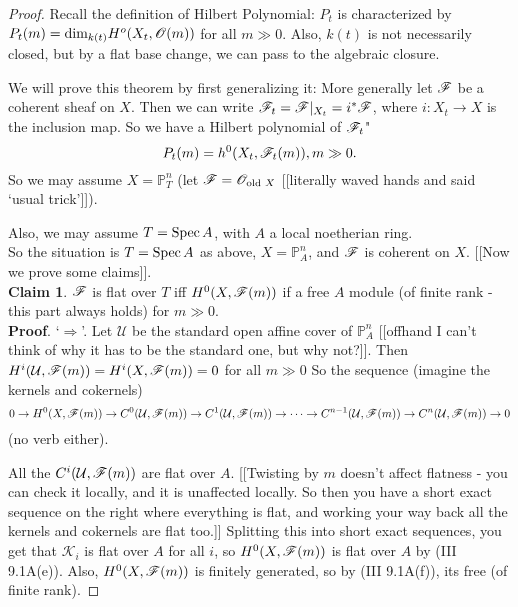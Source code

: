 \begin{proof} Recall the definition of Hilbert Polynomial: $P_t$
is characterized by $P_t(m) = \text{dim}_{k(t)} H^o(X_t,\mathscr{O}(m))$
for all $m \gg 0$. Also, $k(t)$ is not necessarily closed, but by
a flat base change, we can pass to the algebraic closure.

We will prove this theorem by first generalizing it: More
generally let $\mathscr{F}$ be a coherent sheaf on $X$. Then we can write
$\mathscr{F}_t = \mathscr{F}|_{X_t} = i^*\mathscr{F}$, where $i:X_t \rightarrow X$ is the
inclusion map. So we have a Hilbert polynomial of $\mathscr{F}_t$" \[
P_t(m) = h^0(X_t,\mathscr{F}_t(m)), m \gg 0.\] So we may assume $X =
\mathbb{P}^n_{T}$ (let $\mathscr{F} = \mathscr{O}_{\text{old } X}$ [[literally waved
hands and said `usual trick']]).

Also, we may assume $T = \text{\rm Spec\,}{A}$, with $A$ a local noetherian
ring.\\

So the situation is $T = \text{\rm Spec\,}{A}$ as above, $X =
\mathbb{P}^n_{A}$,
and $\mathscr{F}$ is coherent on $X$. [[Now we prove some claims]].\\

\textbf{Claim 1}. $\mathscr{F}$ is flat over $T$ iff $H^0(X,\mathscr{F}(m))$ if a
free $A$ module (of finite rank - this part always holds) for $m
\gg
0$.\\

\textbf{Proof}. `$\Rightarrow$'. Let $\mathscr{U}$ be the standard
open affine cover of $\mathbb{P}^n_{A}$ [[offhand I can't think of
why it has to be the standard one, but why not?]]. Then
$H^i(\mathcal{U},\mathscr{F}(m)) = H^i(X,\mathscr{F}(m)) = 0$ for all $m \gg 0$ So the
sequence (imagine the kernels and cokernels) \[ 0 \rightarrow
H^0(X, \mathscr{F}(m)) \rightarrow C^0(\mathcal{U},\mathscr{F}(m)) \rightarrow C^1(\mathcal{U},\mathscr{F}(m))
\rightarrow \cdots \rightarrow C^{n-1}(\mathcal{U},\mathscr{F}(m)) \rightarrow
C^{n}(\mathcal{U},\mathscr{F}(m)) \rightarrow 0 \] (no verb either).

All the $C^{i}(\mathcal{U},\mathscr{F}(m))$ are flat over $A$. [[Twisting by $m$
doesn't affect flatness - you can check it locally, and it is
unaffected locally. So then you have a short exact sequence on the
right where everything is flat, and working your way back all the
kernels and cokernels are flat too.]] Splitting this into short
exact sequences, you get that $\mathscr{K}_i$ is flat over $A$ for
all $i$, so $H^0(X,\mathscr{F}(m))$ is flat over $A$ by (III 9.1A(e)).
Also, $H^0(X, \mathscr{F}(m))$ is finitely generated, so by (III 9.1A(f)),
its free (of finite rank).

\end{proof}
